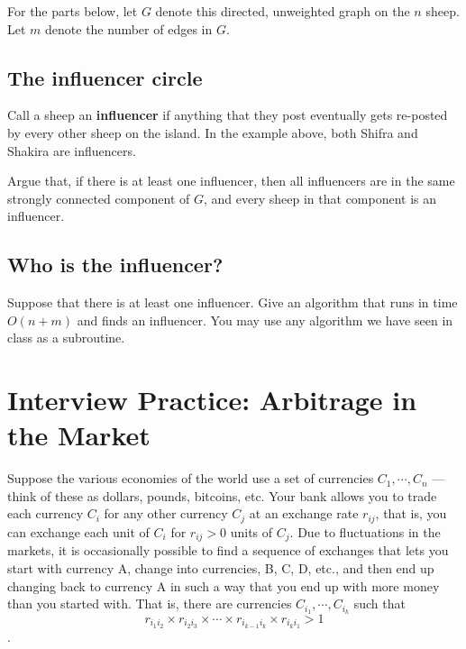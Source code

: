 \documentclass [12pt]{article}
\begin{document}
For the parts below, let $G$ denote this directed, unweighted graph on the $n$ sheep. Let $m$ denote the number of edges in $G$. 

\subsection{The influencer circle } 

Call a sheep an \textbf{influencer} if anything that they post eventually gets re-posted by every other sheep on the island. In the example above, both Shifra and Shakira are influencers.

Argue that, if there is at least one influencer, then all influencers are in the same strongly connected component of $G$, and every sheep in that component is an influencer. 
 
\subsection{Who is the influencer? } 

Suppose that there is at least one influencer. Give an algorithm that runs in time $O(n + m)$ and finds an influencer. You may use any algorithm we have seen in class as a subroutine. 



\pagebreak
\section{Interview Practice: Arbitrage in the Market } 

Suppose the various economies of the world use a set of currencies $C_1, \cdots , C_n$ — think of these as dollars, pounds, bitcoins, etc. Your bank allows you to trade each currency $C_i$ for any other currency $C_j$ at an exchange rate $r_{ij}$, that is, you can exchange each unit of $C_i$ for $r_{ij} > 0$ units of $C_j$. Due to fluctuations in the markets, it is occasionally possible to find a sequence of exchanges that lets you start with currency A, change into currencies, B, C, D, etc., and then end up changing back to currency A in such a way that you end up with more money than you started with. That is, there are currencies $C_{i_1} , \cdots , C_{i_k}$ such that 
$$
r_{i_1i_2} \times r_{i_2i_3} \times \cdots \times r_{i_{k-1}i_k} \times r_{i_k i_1} > 1
$$.
\end{document}
